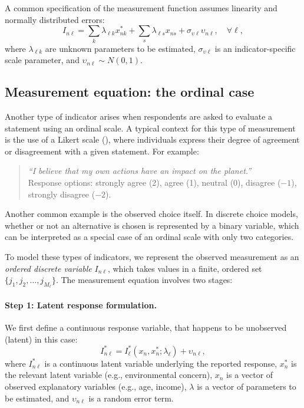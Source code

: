 \documentclass[12pt,a4paper]{article}
\begin{document}
A common specification of the measurement function assumes linearity
and normally distributed errors:
\begin{equation}
\label{eq:linearMeasurement}
I_{n\ell} = \sum_k \lambda_{\ell k}  x_{nk}^* + \sum_{s} \lambda_{\ell s} x_{ns} + \sigma_{\upsilon \ell} \upsilon_{n\ell}, \quad \forall \ell,
\end{equation}
where $\lambda_{\ell k}$ are unknown parameters to be estimated, $\sigma_{\upsilon \ell}$ is an indicator-specific scale parameter, and $\upsilon_{n\ell} \sim N(0, 1)$.


\subsection{Measurement equation: the ordinal case}

Another type of indicator arises when respondents are asked to
evaluate a statement using an ordinal scale. A typical context for
this type of measurement is the use of a Likert scale
(\cite{likert1932technique}), where individuals express their degree of
agreement or disagreement with a given statement. For example:
\begin{quote}
\emph{``I believe that my own actions have an impact on the planet.''} \\
Response options: strongly agree (2), agree (1), neutral (0), disagree ($-1$), strongly disagree ($-2$).
\end{quote}

Another common example is the observed choice itself. In discrete
choice models, whether or not an alternative is chosen is represented
by a binary variable, which can be interpreted as a special case of an
ordinal scale with only two categories.

To model these types of indicators, we represent the observed
measurement as an \emph{ordered discrete variable} $I_{n\ell}$, which
takes values in a finite, ordered set $\{j_1, j_2, \ldots, j_{M_\ell}\}$. The
measurement equation involves two stages:

\paragraph{Step 1: Latent response formulation.} We first define a continuous response variable, that happens to be unobserved (latent) in this case:
\begin{equation}
I^*_{n\ell} = I^*_\ell(x_n, x_n^*; \lambda_\ell) + \upsilon_{n\ell},
\end{equation}
where $I^*_{n\ell}$ is a continuous latent variable underlying the
reported response, $x_n^*$ is the relevant latent variable (e.g.,
environmental concern), $x_n$ is a vector of observed explanatory
variables (e.g., age, income), $\lambda$ is a vector of parameters to
be estimated, and $\upsilon_{n\ell}$ is a random error term.
\end{document}
